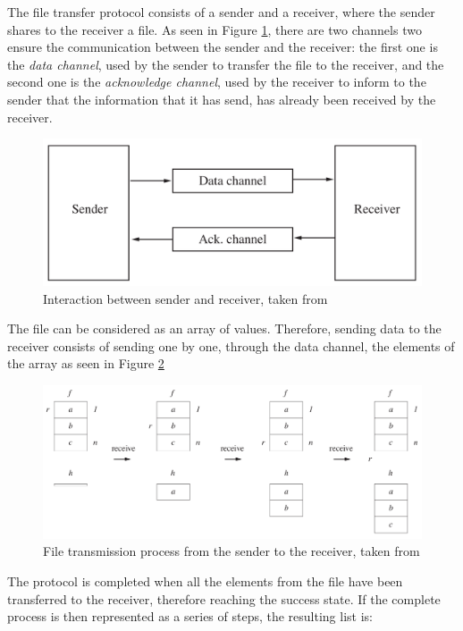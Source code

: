 The file transfer protocol consists of a sender and a receiver, where the sender shares to the receiver a file. As seen in Figure \ref{fig:cs5}, there are two channels two ensure the communication between the sender and the receiver: the first one is the \textit{data channel}, used by the sender to transfer the file to the receiver, and the second one is the \textit{acknowledge channel}, used by the receiver to inform to the sender that the information that it has send, has already been received by the receiver.
\begin{figure}[H]
    \centering
    \includegraphics[scale = 0.2]{images/CS5.png}
    \caption{Interaction between sender and receiver, taken from \cite{Abrial2011}}
    \label{fig:cs5}
\end{figure}
The file can be considered as an array of values. Therefore, sending data to the receiver consists of sending one by one, through the data channel, the elements of the array as seen in Figure \ref{fig:cs6}  
\begin{figure}[H]
    \centering
    \includegraphics[scale = 0.3]{images/CS6.png}
    \caption{File transmission process from the sender to the receiver, taken from \cite{Abrial2011}}
    \label{fig:cs6}
\end{figure}
The protocol is completed when all the elements from the file have been transferred to the receiver, therefore reaching the success state. If the complete process is then represented as a series of steps, the resulting list is:

